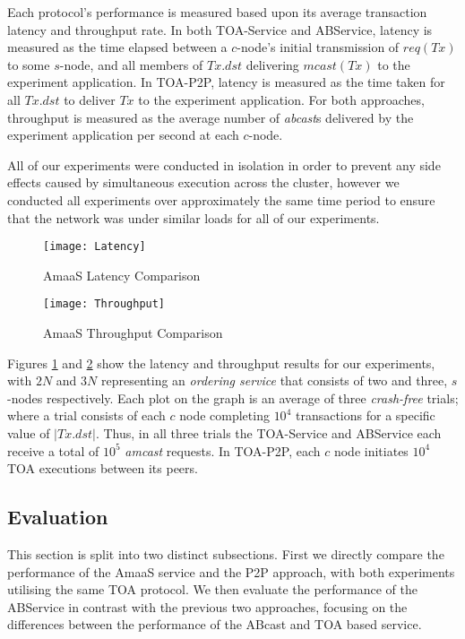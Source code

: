     Each protocol's performance is measured based upon its average transaction latency and throughput rate. In both TOA-Service and ABService, latency is measured as the time elapsed between a $c$-node's initial transmission of $req(Tx)$ to some $s$-node, and all members of $Tx.dst$ delivering $mcast(Tx)$ to the experiment application. In TOA-P2P, latency is measured as the time taken for all $Tx.dst$ to deliver $Tx$ to the experiment application. For both approaches, throughput is measured as the average number of \emph{abcast}s delivered by the experiment application per second at each $c$-node.
	
	All of our experiments were conducted in isolation in order to prevent any side effects caused by simultaneous execution across the cluster, however we conducted all experiments over approximately the same time period to ensure that the network was under similar loads for all of our experiments. 
	
	\begin{figure}[htbp!]
	 \texttt{[image: Latency]}
	 \caption{AmaaS Latency Comparison}
	 \label{fig:LatencyGraph}
	\end{figure}
	
	\begin{figure}[htbp!]
	 \texttt{[image: Throughput]}
	 \caption{AmaaS Throughput Comparison}
	 \label{fig:ThroughputGraph}
	\end{figure}
	
	Figures \ref{fig:LatencyGraph} and \ref{fig:ThroughputGraph} show the latency and throughput results for our experiments, with $2N$ and $3N$ representing an \emph{ordering service} that consists of two and three, $s$-nodes respectively.  Each plot on the graph is an average of three \emph{crash-free} trials; where a trial consists of each $c$ node completing $10^4$ transactions for a specific value of $|Tx.dst|$. Thus, in all three trials the TOA-Service and ABService each receive a total of $10^5$ \emph{amcast} requests. In TOA-P2P, each $c$ node initiates $10^4$ TOA executions between its peers.  
	
    \subsection{Evaluation}
    This section is split into two distinct subsections.  First we directly compare the performance of the \textsf{AmaaS} service and the P2P approach, with both experiments utilising the same TOA protocol.  We then evaluate the performance of the ABService in contrast with the previous two approaches, focusing on the differences between the performance of the ABcast and TOA based service.  
    
